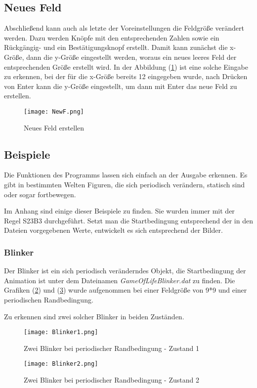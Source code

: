 \documentclass{scrartcl}
\begin{document}
\subsection{Neues Feld}
Abschließend kann auch als letzte der Voreinstellungen die Feldgröße verändert werden. Dazu werden Knöpfe mit den entsprechenden Zahlen sowie ein Rückgängig- und ein Bestätigungsknopf erstellt. Damit kann zunächst die x-Größe, dann die y-Größe eingestellt werden, woraus ein neues leeres Feld der entsprechenden Größe erstellt wird. In der Abbildung (\ref{NewF}) ist eine solche Eingabe zu erkennen, bei der für die x-Größe bereits 12 eingegeben wurde, nach Drücken von Enter kann die y-Größe eingestellt, um dann mit Enter das neue Feld zu erstellen.
\begin{figure}[!h]
	\begin{center}
		\texttt{[image: NewF.png]}
		\caption{Neues Feld erstellen}
		\label{NewF}
	\end{center}
\end{figure}

\subsection{Beispiele}
Die Funktionen des Programms lassen sich einfach an der Ausgabe erkennen. Es gibt in bestimmten Welten Figuren, die sich periodisch verändern, statisch sind oder sogar fortbewegen.

Im Anhang sind einige dieser Beispiele zu finden. Sie wurden immer mit der Regel S23B3 durchgeführt. Setzt man die Startbedingung entsprechend der in den Dateien vorgegebenen Werte, entwickelt es sich entsprechend der Bilder.
\subsubsection{Blinker}
Der Blinker ist ein sich periodisch veränderndes Objekt, die Startbedingung der Animation ist unter dem Dateinamen \textit{GameOfLifeBlinker.dat} zu finden. Die Grafiken (\ref{blink1}) und (\ref{blink2}) wurde aufgenommen bei einer Feldgröße von 9*9 und einer periodischen Randbedingung.

Zu erkennen sind zwei solcher Blinker in beiden Zuständen.
\begin{figure}[p]
	\begin{center}
		\texttt{[image: Blinker1.png]}
		\caption{Zwei Blinker bei periodischer Randbedingung - Zustand 1}
		\label{blink1}
	\end{center}
\end{figure}
\begin{figure}[p]
	\begin{center}
		\texttt{[image: Blinker2.png]}
		\caption{Zwei Blinker bei periodischer Randbedingung - Zustand 2}
		\label{blink2}
	\end{center}
\end{figure}
\end{document}
